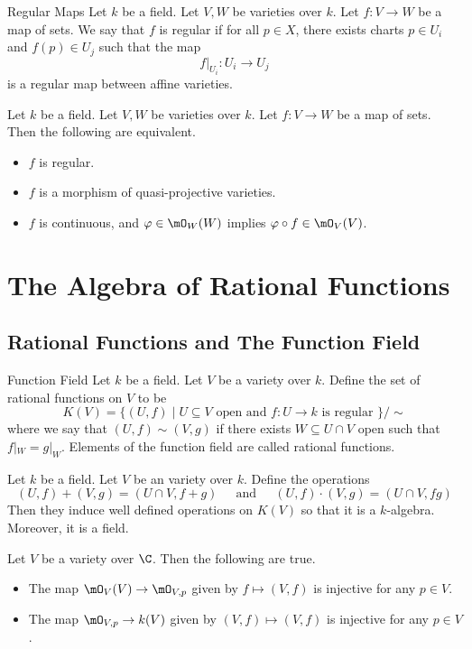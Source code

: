 \documentclass[a4paper]{article}
\begin{document}
\begin{defn}{Regular Maps}{} Let $k$ be a field. Let $V,W$ be varieties over $k$. Let $f:V\to W$ be a map of sets. We say that $f$ is regular if for all $p\in X$, there exists charts $p\in U_i$ and $f(p)\in U_j$ such that the map $$f|_{U_i}:U_i\to U_j$$ is a regular map between affine varieties. 
\end{defn}

\begin{prp}{}{} Let $k$ be a field. Let $V,W$ be varieties over $k$. Let $f:V\to W$ be a map of sets. Then the following are equivalent. 
\begin{itemize}
\item $f$ is regular. 
\item $f$ is a morphism of quasi-projective varieties. 
\item $f$ is continuous, and $\varphi\in\mO_W(W)$ implies $\varphi\circ f\in\mO_V(V)$. 
\end{itemize}
\end{prp}


\pagebreak
\section{The Algebra of Rational Functions}
\subsection{Rational Functions and The Function Field}
\begin{defn}{Function Field}{} Let $k$ be a field. Let $V$ be a variety over $k$. Define the set of rational functions on $V$ to be $$K(V)=\{(U,f)\;|\;U\subseteq V\text{ open and }f:U\to k\text{ is regular }\}/\sim$$ where we say that $(U,f)\sim(V,g)$ if there exists $W\subseteq U\cap V$ open such that $f|_W=g|_W$. Elements of the function field are called rational functions. 
\end{defn}

\begin{lmm}{}{} Let $k$ be a field. Let $V$ be an variety over $k$. Define the operations $$(U,f)+(V,g)=(U\cap V,f+g)\;\;\;\;\text{ and }\;\;\;\;(U,f)\cdot(V,g)=(U\cap V,fg)$$ Then they induce well defined operations on $K(V)$ so that it is a $k$-algebra. Moreover, it is a field. 
\end{lmm}

\begin{lmm}{}{} Let $V$ be a variety over $\C$. Then the following are true. 
\begin{itemize}
\item The map $\mO_V(V)\to\mO_{V,p}$ given by $f\mapsto(V,f)$ is injective for any $p\in V$. 
\item The map $\mO_{V,p}\to k(V)$ given by $(V,f)\mapsto(V,f)$ is injective for any $p\in V$. 
\end{itemize}
\end{lmm}
\end{document}
